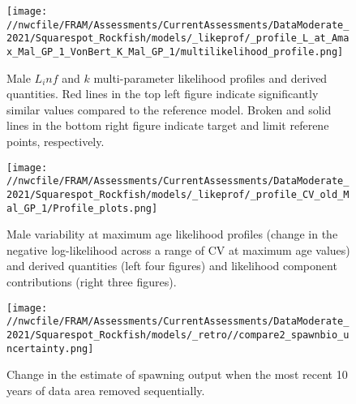 \documentclass[11pt,
  english,
  a4paper,
]{article}
\begin{document}
\begin{figure}
\centering
\texttt{[image: //nwcfile/FRAM/Assessments/CurrentAssessments/DataModerate\_2021/Squarespot\_Rockfish/models/\_likeprof/\_profile\_L\_at\_Amax\_Mal\_GP\_1\_VonBert\_K\_Mal\_GP\_1/multilikelihood\_profile.png]}
\caption{Male {\(L_inf\)\leavevmode\tagmcend\tagstructend} and {\(k\)\leavevmode\tagmcend\tagstructend} multi-parameter likelihood profiles and derived quantities. Red lines in the top left figure indicate significantly similar values compared to the reference model. Broken and solid lines in the bottom right figure indicate target and limit referene points, respectively.\label{fig:Linf_k_m-profile}}
\end{figure}

\tagmcend\tagstructend


\begin{figure}
\centering
\texttt{[image: //nwcfile/FRAM/Assessments/CurrentAssessments/DataModerate\_2021/Squarespot\_Rockfish/models/\_likeprof/\_profile\_CV\_old\_Mal\_GP\_1/Profile\_plots.png]}
\caption{Male variability at maximum age likelihood profiles (change in the negative log-likelihood across a range of CV at maximum age values) and derived quantities (left four figures) and likelihood component contributions (right three figures).\label{fig:CVold_m-profile-combo}}
\end{figure}

\tagmcend\tagstructend


\begin{figure}
\centering
\texttt{[image: //nwcfile/FRAM/Assessments/CurrentAssessments/DataModerate\_2021/Squarespot\_Rockfish/models/\_retro//compare2\_spawnbio\_uncertainty.png]}
\caption{Change in the estimate of spawning output when the most recent 10 years of data area removed sequentially.\label{fig:retro-ssb}}
\end{figure}
\end{document}
